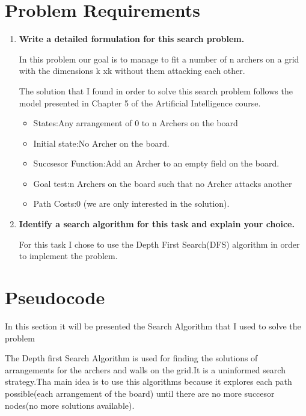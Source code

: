\documentclass{article}
\begin{document}
\section {\Large Problem Requirements} \vspace*{1cm}
\begin{enumerate}
  \item \textbf{Write a detailed formulation for this search problem.}
  \par In this problem our goal is to manage to fit a number of n archers on
  a grid with the dimensions k xk without them attacking each other.
  \par The solution that I found in order to solve this search problem follows the
  model presented in Chapter 5 of the Artificial Intelligence course.
  \begin{itemize}
  \item States:Any arrangement of 0 to n Archers on the board
  \item Initial state:No Archer on the board.
  \item Succsesor Function:Add an Archer to an empty field on the board.
  \item Goal test:n Archers on the board such that no Archer attacks another
  \item Path Costs:0 (we are only interested in the solution).
\end{itemize}
  \item \textbf{Identify a search algorithm for this task and explain your choice.}
  \par For this task I chose to use the Depth First Search(DFS) algorithm in order to implement the problem.
\end{enumerate}
\newpage
\section {\LARGE Pseudocode}
\Large \par In this section it will be presented the Search Algorithm that I used to solve the problem
\par The Depth first Search Algorithm is used for finding the solutions of arrangements for the archers and walls on the grid.It is a uninformed search strategy.Tha main idea is to use this algorithms because it explores each path possible(each arrangement of the board) until there are no more succesor nodes(no more solutions available).
\end{document}
